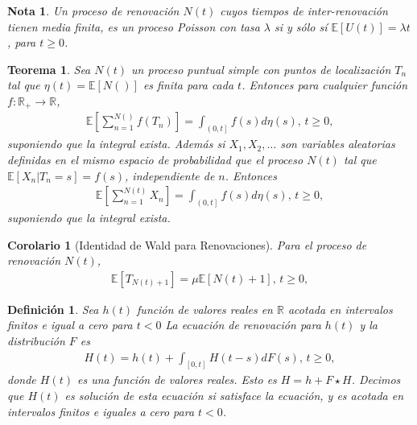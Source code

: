 \documentclass{article}
\newtheorem{Def}{Definición}[section]
\newtheorem{Teo}{Teorema}[section]
\newtheorem{Note}{Nota}[section]
\newtheorem{Cor}{Corolario}[section]
\newcommand{\rea}{\mathbb{R}}
\newcommand{\esp}{\mathbb{E}}
\numberwithin{equation}{section}
\begin{document}
\begin{Note}
Un proceso de renovaci\'on $N\left(t\right)$ cuyos tiempos de inter-renovaci\'on tienen media finita, es un proceso Poisson con tasa $\lambda$ si y s\'olo s\'i $\esp\left[U\left(t\right)\right]=\lambda t$, para $t\geq0$.
\end{Note}

\begin{Teo}
Sea $N\left(t\right)$ un proceso puntual simple con puntos de localizaci\'on $T_{n}$ tal que $\eta\left(t\right)=\esp\left[N\left(\right)\right]$ es finita para cada $t$. Entonces para cualquier funci\'on $f:\rea_{+}\rightarrow\rea$,
\begin{eqnarray}
\esp\left[\sum_{n=1}^{N\left(\right)}f\left(T_{n}\right)\right]=\int_{\left(0,t\right]}f\left(s\right)d\eta\left(s\right)\textrm{,  }t\geq0,
\end{eqnarray}
suponiendo que la integral exista. Adem\'as si $X_{1},X_{2},\ldots$ son variables aleatorias definidas en el mismo espacio de probabilidad que el proceso $N\left(t\right)$ tal que $\esp\left[X_{n}|T_{n}=s\right]=f\left(s\right)$, independiente de $n$. Entonces
\begin{eqnarray}
\esp\left[\sum_{n=1}^{N\left(t\right)}X_{n}\right]=\int_{\left(0,t\right]}f\left(s\right)d\eta\left(s\right)\textrm{,  }t\geq0,
\end{eqnarray} 
suponiendo que la integral exista. 
\end{Teo}

\begin{Cor}[Identidad de Wald para Renovaciones]
Para el proceso de renovaci\'on $N\left(t\right)$,
\begin{eqnarray}
\esp\left[T_{N\left(t\right)+1}\right]=\mu\esp\left[N\left(t\right)+1\right]\textrm{,  }t\geq0,
\end{eqnarray}  
\end{Cor}


\begin{Def}
Sea $h\left(t\right)$ funci\'on de valores reales en $\rea$ acotada en intervalos finitos e igual a cero para $t<0$ La ecuaci\'on de renovaci\'on para $h\left(t\right)$ y la distribuci\'on $F$ es
\begin{eqnarray}\label{Ec.Renovacion}
H\left(t\right)=h\left(t\right)+\int_{\left[0,t\right]}H\left(t-s\right)dF\left(s\right)\textrm{,    }t\geq0,
\end{eqnarray}
donde $H\left(t\right)$ es una funci\'on de valores reales. Esto es $H=h+F\star H$. Decimos que $H\left(t\right)$ es soluci\'on de esta ecuaci\'on si satisface la ecuaci\'on, y es acotada en intervalos finitos e iguales a cero para $t<0$.
\end{Def}
\end{document}
